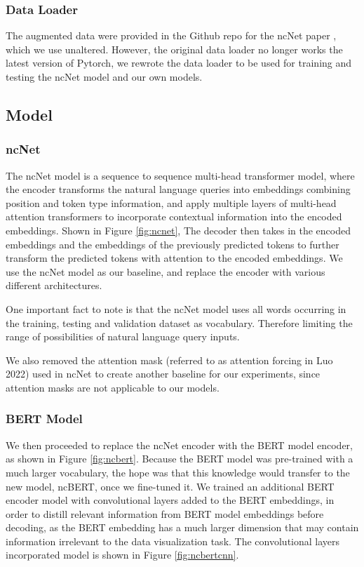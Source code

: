 \documentclass[
	a4paper, %
	10pt, %
	unnumberedsections, %
	twoside, %
]{t0003}
\begin{document}
\subsubsection{Data Loader} The augmented data were provided in the Github repo for the ncNet paper\cite{Luo:2022qr} , which we use unaltered. However, the original data loader no longer works the latest version of Pytorch, we rewrote the data loader to be used for training and testing the ncNet model and our own models.

\subsection{Model}

\subsubsection{ncNet} The ncNet\cite{Luo:2022qr} model is a sequence to sequence multi-head transformer model, where the encoder transforms the natural language queries into embeddings combining position and token type information, and apply multiple layers of multi-head attention transformers to incorporate contextual information into the encoded embeddings. Shown in Figure \ref{fig:ncnet}, The decoder then takes in the encoded embeddings and the embeddings of the previously predicted tokens to further transform the predicted tokens with attention to the encoded embeddings. We use the ncNet model as our baseline, and replace the encoder with various different architectures.

One important fact to note is that the ncNet model uses all words occurring in the training, testing and validation dataset as vocabulary. Therefore limiting the range of possibilities of natural language query inputs.

We also removed the attention mask (referred to as attention forcing in Luo 2022\cite{Luo:2022qr}) used in ncNet to create another baseline for our experiments, since attention masks are not applicable to our models.

\subsubsection{BERT Model} We then proceeded to replace the ncNet encoder with the BERT model encoder, as shown in Figure \ref{fig:ncbert}. Because the BERT model was pre-trained with a much larger vocabulary, the hope was that this knowledge would transfer to the new model, ncBERT, once we fine-tuned it. We trained an additional BERT encoder model with convolutional layers added to the BERT embeddings, in order to distill relevant information from BERT model embeddings before decoding, as the BERT embedding has a much larger dimension that may contain information irrelevant to the data visualization task. The convolutional layers incorporated model is shown in Figure \ref{fig:ncbertcnn}.
\end{document}
